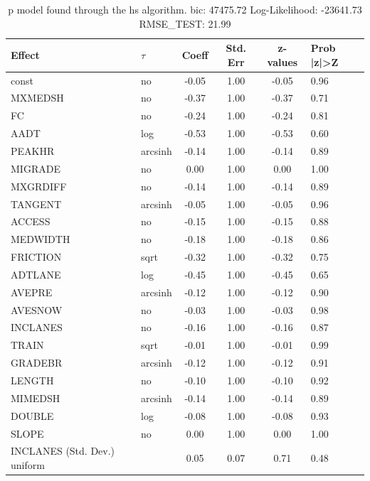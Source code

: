 \begin{table}
	\caption{p model found through the hs algorithm. bic: 47475.72 Log-Likelihood: -23641.73 RMSE_TEST: 21.99}
	\begin{center}
		\begin{tabular}{|l|l|c|c|c|l|}
			\hline
			Effect & $\tau$ & Coeff & Std. Err & z-values & Prob |z|>Z \\
			\hline
			const & no & -0.05 & 1.00 & -0.05 & 0.96 \\
			\hline
			MXMEDSH & no & -0.37 & 1.00 & -0.37 & 0.71 \\
			\hline
			FC & no & -0.24 & 1.00 & -0.24 & 0.81 \\
			\hline
			AADT & log & -0.53 & 1.00 & -0.53 & 0.60 \\
			\hline
			PEAKHR & arcsinh & -0.14 & 1.00 & -0.14 & 0.89 \\
			\hline
			MIGRADE & no & 0.00 & 1.00 & 0.00 & 1.00 \\
			\hline
			MXGRDIFF & no & -0.14 & 1.00 & -0.14 & 0.89 \\
			\hline
			TANGENT & arcsinh & -0.05 & 1.00 & -0.05 & 0.96 \\
			\hline
			ACCESS & no & -0.15 & 1.00 & -0.15 & 0.88 \\
			\hline
			MEDWIDTH & no & -0.18 & 1.00 & -0.18 & 0.86 \\
			\hline
			FRICTION & sqrt & -0.32 & 1.00 & -0.32 & 0.75 \\
			\hline
			ADTLANE & log & -0.45 & 1.00 & -0.45 & 0.65 \\
			\hline
			AVEPRE & arcsinh & -0.12 & 1.00 & -0.12 & 0.90 \\
			\hline
			AVESNOW & no & -0.03 & 1.00 & -0.03 & 0.98 \\
			\hline
			INCLANES & no & -0.16 & 1.00 & -0.16 & 0.87 \\
			\hline
			TRAIN & sqrt & -0.01 & 1.00 & -0.01 & 0.99 \\
			\hline
			GRADEBR & arcsinh & -0.12 & 1.00 & -0.12 & 0.91 \\
			\hline
			LENGTH & no & -0.10 & 1.00 & -0.10 & 0.92 \\
			\hline
			MIMEDSH & arcsinh & -0.14 & 1.00 & -0.14 & 0.89 \\
			\hline
			DOUBLE & log & -0.08 & 1.00 & -0.08 & 0.93 \\
			\hline
			SLOPE & no & 0.00 & 1.00 & 0.00 & 1.00 \\
			\hline
			INCLANES (Std. Dev.) uniform &  & 0.05 & 0.07 & 0.71 & 0.48 \\

\end{tabular}
\end{center}
\end{table}
